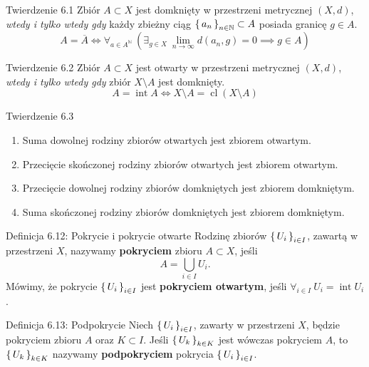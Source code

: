 \documentclass{article}
\newcommand{\N}{\mathbb{N}}
\newcommand{\lin}[1]{\lim\limits_{n\to\infty}{#1}}
\newcommand*\closure[1]{\overline{#1}}
\DeclareMathOperator{\interior}{int}
\DeclareMathOperator{\Closure}{cl}
\newcommand{\seq}[1]{\set{#1_n}_{n\in\N}}
\newcommand{\ri}[1]{\set{#1_i}_{i\in I}}
\begin{document}
\begin{twier}{Twierdzenie 6.1}
    Zbiór $A\subset X$ jest domknięty w przestrzeni metrycznej $(X,d)$, \textit{wtedy i tylko wtedy gdy} każdy zbieżny ciąg $\seq{a}\subset A$
    posiada granicę $g\in A$.
    \begin{equation*}
        A=\closure{A}\iff\forall_{a\in A^\N}\ \left(\exists_{g\in X}\ \lin{d(a_n,g)=0}\implies g\in A\right)
    \end{equation*}
\end{twier}

\begin{twier}{Twierdzenie 6.2}
    Zbiór $A\subset X$ jest otwarty w przestrzeni metrycznej $(X,d)$, \textit{wtedy i tylko wtedy gdy} zbiór $X\setminus A$ jest domknięty.
    \begin{equation*}
        A=\interior{A}\iff X\setminus A=\Closure{\left(X\setminus A\right)}
    \end{equation*}
\end{twier}

\begin{twier}{Twierdzenie 6.3}
    \begin{enumerate}[label=(\arabic*)]
        \item Suma dowolnej rodziny zbiorów otwartych jest zbiorem otwartym.
        \item Przecięcie skończonej rodziny zbiorów otwartych jest zbiorem otwartym.
        \item Przecięcie dowolnej rodziny zbiorów domkniętych jest zbiorem domkniętym.
        \item Suma skończonej rodziny zbiorów domkniętych jest zbiorem domkniętym.
    \end{enumerate}
\end{twier}

\begin{defr}{Definicja 6.12: Pokrycie i pokrycie otwarte}
    Rodzinę zbiorów $\ri{U}$, zawartą w przestrzeni $X$, nazywamy \textbf{pokryciem} zbioru $A\subset X$, jeśli
    \begin{equation*}
        A=\bigcup_{i\in I}{U_i}.
    \end{equation*}
    Mówimy, że pokrycie $\ri{U}$ jest \textbf{pokryciem otwartym}, jeśli $\forall_{i\in I}\ U_i=\interior{U_i}$.
\end{defr}

\begin{defr}{Definicja 6.13: Podpokrycie}
    Niech $\ri{U}$, zawarty w przestrzeni $X$, będzie pokryciem zbioru $A$ oraz $K\subset I$. Jeśli $\set{U_k}_{k\in K}$
    jest wówczas pokryciem $A$, to $\set{U_k}_{k\in K}$ nazywamy \textbf{podpokryciem} pokrycia $\ri{U}$.
\end{defr}
\end{document}
